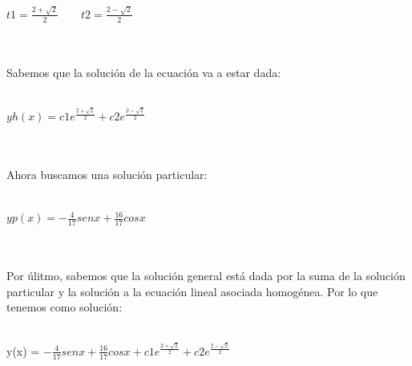 \documentclass[a4paper,10pt]{article}
\begin{document}
\centerline{$t1= \frac{2+  \sqrt{2}}{2} \quad\quad t2=\frac{2-\sqrt{2}}{2}$ }\\\\
Sabemos que la solución de la ecuación va a estar dada:\\\\
\centerline{$yh(x)= c1e^{\frac{2+  \sqrt{2}}{2}}+c2e^{\frac{2-\sqrt{2}}{2}}$}\\\\
Ahora buscamos una solución particular:\\\\
\centerline{$yp(x)= -\frac{4}{17} senx + \frac{16}{17}cosx$ }\\\\
Por úlitmo, sabemos que la solución general está dada por la suma de la solución particular y la solución a la ecuación lineal asociada homogénea. Por lo que tenemos como solución:\\\\
\centerline{y(x) = $ -\frac{4}{17} senx + \frac{16}{17}cosx + c1e^{\frac{2+  \sqrt{2}}{2}}+c2e^{\frac{2-\sqrt{2}}{2}}$}\\\\\\
\end{document}
